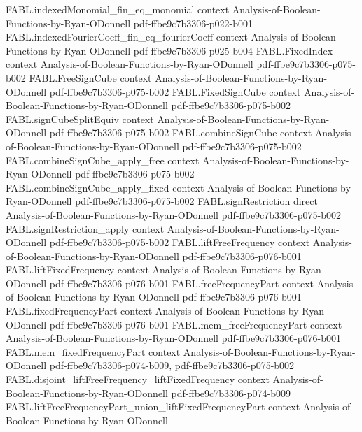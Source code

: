\begin{theorem}
\proofstep
  {FABL.indexedMonomial_fin_eq_monomial}
  {context}
  {Analysis-of-Boolean-Functions-by-Ryan-ODonnell}
  {pdf-ffbe9c7b3306-p022-b001}
\proofstep
  {FABL.indexedFourierCoeff_fin_eq_fourierCoeff}
  {context}
  {Analysis-of-Boolean-Functions-by-Ryan-ODonnell}
  {pdf-ffbe9c7b3306-p025-b004}
\proofstep
  {FABL.FixedIndex}
  {context}
  {Analysis-of-Boolean-Functions-by-Ryan-ODonnell}
  {pdf-ffbe9c7b3306-p075-b002}
\proofstep
  {FABL.FreeSignCube}
  {context}
  {Analysis-of-Boolean-Functions-by-Ryan-ODonnell}
  {pdf-ffbe9c7b3306-p075-b002}
\proofstep
  {FABL.FixedSignCube}
  {context}
  {Analysis-of-Boolean-Functions-by-Ryan-ODonnell}
  {pdf-ffbe9c7b3306-p075-b002}
\proofstep
  {FABL.signCubeSplitEquiv}
  {context}
  {Analysis-of-Boolean-Functions-by-Ryan-ODonnell}
  {pdf-ffbe9c7b3306-p075-b002}
\proofstep
  {FABL.combineSignCube}
  {context}
  {Analysis-of-Boolean-Functions-by-Ryan-ODonnell}
  {pdf-ffbe9c7b3306-p075-b002}
\proofstep
  {FABL.combineSignCube_apply_free}
  {context}
  {Analysis-of-Boolean-Functions-by-Ryan-ODonnell}
  {pdf-ffbe9c7b3306-p075-b002}
\proofstep
  {FABL.combineSignCube_apply_fixed}
  {context}
  {Analysis-of-Boolean-Functions-by-Ryan-ODonnell}
  {pdf-ffbe9c7b3306-p075-b002}
\proofstep
  {FABL.signRestriction}
  {direct}
  {Analysis-of-Boolean-Functions-by-Ryan-ODonnell}
  {pdf-ffbe9c7b3306-p075-b002}
\proofstep
  {FABL.signRestriction_apply}
  {context}
  {Analysis-of-Boolean-Functions-by-Ryan-ODonnell}
  {pdf-ffbe9c7b3306-p075-b002}
\proofstep
  {FABL.liftFreeFrequency}
  {context}
  {Analysis-of-Boolean-Functions-by-Ryan-ODonnell}
  {pdf-ffbe9c7b3306-p076-b001}
\proofstep
  {FABL.liftFixedFrequency}
  {context}
  {Analysis-of-Boolean-Functions-by-Ryan-ODonnell}
  {pdf-ffbe9c7b3306-p076-b001}
\proofstep
  {FABL.freeFrequencyPart}
  {context}
  {Analysis-of-Boolean-Functions-by-Ryan-ODonnell}
  {pdf-ffbe9c7b3306-p076-b001}
\proofstep
  {FABL.fixedFrequencyPart}
  {context}
  {Analysis-of-Boolean-Functions-by-Ryan-ODonnell}
  {pdf-ffbe9c7b3306-p076-b001}
\proofstep
  {FABL.mem_freeFrequencyPart}
  {context}
  {Analysis-of-Boolean-Functions-by-Ryan-ODonnell}
  {pdf-ffbe9c7b3306-p076-b001}
\proofstep
  {FABL.mem_fixedFrequencyPart}
  {context}
  {Analysis-of-Boolean-Functions-by-Ryan-ODonnell}
  {pdf-ffbe9c7b3306-p074-b009,
    pdf-ffbe9c7b3306-p075-b002}
\proofstep
  {FABL.disjoint_liftFreeFrequency_liftFixedFrequency}
  {context}
  {Analysis-of-Boolean-Functions-by-Ryan-ODonnell}
  {pdf-ffbe9c7b3306-p074-b009}
\proofstep
  {FABL.liftFreeFrequencyPart_union_liftFixedFrequencyPart}
  {context}
  {Analysis-of-Boolean-Functions-by-Ryan-ODonnell}

\end{theorem}
